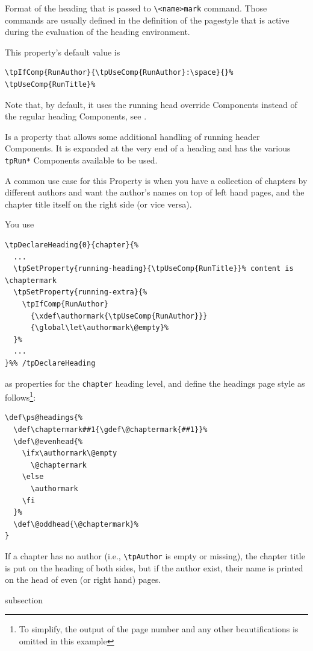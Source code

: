 Format of the heading that is passed to \lstinline{\<name>mark}
command. Those commands are usually defined in the definition of the
pagestyle that is active during the evaluation of the heading
environment.

This property's default value is
\begin{lstlisting}[style=tex]
\tpIfComp{RunAuthor}{\tpUseComp{RunAuthor}:\space}{}%
\tpUseComp{RunTitle}%
\end{lstlisting}
Note that, by default, it uses the running head override Components
instead of the regular heading Components, see
.


Is a property that allows some additional handling of running header
Components. It is expanded at the very end of a heading and has the
various \lstinline{tpRun*} Components available to be used.

A common use case for this Property is when you have a collection of
chapters by different authors and want the author's names on top of
left hand pages, and the chapter title itself on the right side (or
vice versa).

You use
\begin{lstlisting}
\tpDeclareHeading{0}{chapter}{%
  ...
  \tpSetProperty{running-heading}{\tpUseComp{RunTitle}}% content is  \chaptermark
  \tpSetProperty{running-extra}{%
    \tpIfComp{RunAuthor}
      {\xdef\authormark{\tpUseComp{RunAuthor}}}
      {\global\let\authormark\@empty}%
  }%
  ...
}%% /tpDeclareHeading
\end{lstlisting}
as properties for the \lstinline{chapter} heading level, and define
the headings page style as follows\footnote{To simplify, the output of
  the page number and any other beautifications is omitted in this
  example}:
\begin{lstlisting}
\def\ps@headings{%
  \def\chaptermark##1{\gdef\@chaptermark{##1}}%
  \def\@evenhead{%
    \ifx\authormark\@empty
      \@chaptermark
    \else
      \authormark
    \fi
  }%
  \def\@oddhead{\@chaptermark}%
}
\end{lstlisting}
If a chapter has no author (i.e.,
\lstinline{\tpAuthor} is empty or missing), the chapter title is put
on the heading of both sides, but if the author exist, their name is
printed on the head of even (or right hand) pages.


\begin{heading}[label=sec:hdg:bkm]{subsection}
\end{heading}


